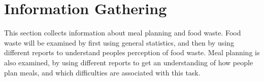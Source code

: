 \chapter{Information Gathering}\label{InformationGathering}
This section collects information about meal planning and food waste. Food waste will be examined by first using general statistics, and then by using different reports to understand peoples perception of food waste. Meal planning is also examined, by using different reports to get an understanding of how people plan meals, and which difficulties are associated with this task. 
 






%


%
